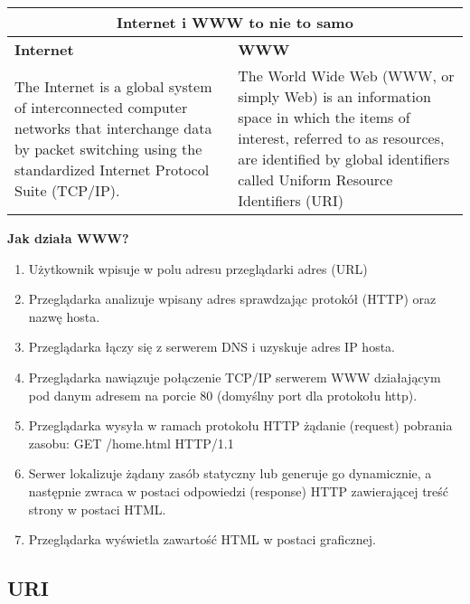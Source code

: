 \documentclass[../main.tex]{subfiles}
\begin{document}
    \begin{table}[H]
        \begin{center}
            \begin{tabular}{|p{8cm}|p{8cm}|}
                \hline
                \multicolumn{2}{|c|}{\textbf{Internet i WWW to nie to samo}}\\
                \hline
                \textbf{Internet} & \textbf{WWW}\\
                \hline
                \hline
                The Internet is a global system of interconnected computer networks that interchange data by packet switching using the standardized Internet Protocol Suite (TCP/IP).
                &
                The World Wide Web (WWW, or simply Web) is an information space in which the items of interest, referred to as resources, are identified by global identifiers called Uniform Resource Identifiers (URI)\\
                \hline
            \end{tabular}
        \end{center}
    \end{table}

    \textbf{Jak działa WWW?}
    \begin{enumerate}
        \item Użytkownik wpisuje w polu adresu przeglądarki adres (URL)
        \item Przeglądarka analizuje wpisany adres sprawdzając protokół (HTTP) oraz nazwę hosta.
        \item Przeglądarka łączy się z serwerem DNS i uzyskuje adres IP hosta.
        \item Przeglądarka nawiązuje połączenie TCP/IP serwerem WWW działającym pod danym adresem na porcie 80 (domyślny port dla protokołu http).
        \item Przeglądarka wysyła w ramach protokołu HTTP żądanie (request) pobrania zasobu: GET /home.html HTTP/1.1
        \item Serwer lokalizuje żądany zasób statyczny lub generuje go dynamicznie, a następnie zwraca w postaci odpowiedzi (response) HTTP zawierającej treść strony w postaci HTML.
        \item Przeglądarka wyświetla zawartość HTML w postaci graficznej.
    \end{enumerate}

    \subsection{URI}
\end{document}
